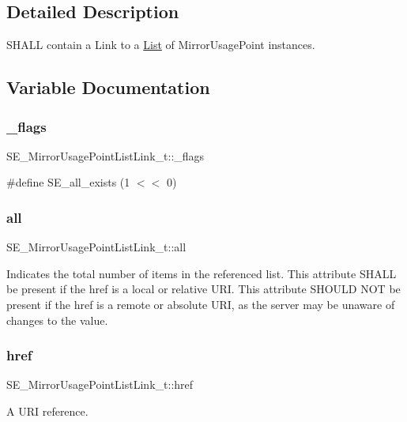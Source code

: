 \subsection{Detailed Description}
S\+H\+A\+LL contain a Link to a \hyperlink{structList}{List} of Mirror\+Usage\+Point instances. 

\subsection{Variable Documentation}
\mbox{\label{group__MirrorUsagePointListLink_ga7a496bf032accedbfb6d6c3b2fea9c22}} 
\subsubsection{\texorpdfstring{\+\_\+flags}{\_flags}}
{\footnotesize\ttfamily S\+E\+\_\+\+Mirror\+Usage\+Point\+List\+Link\+\_\+t\+::\+\_\+flags}

\#define S\+E\+\_\+all\+\_\+exists (1 $<$$<$ 0) \mbox{\label{group__MirrorUsagePointListLink_gad6bab1c2ec9114c3752213d0707541fc}} 
\subsubsection{\texorpdfstring{all}{all}}
{\footnotesize\ttfamily S\+E\+\_\+\+Mirror\+Usage\+Point\+List\+Link\+\_\+t\+::all}

Indicates the total number of items in the referenced list. This attribute S\+H\+A\+LL be present if the href is a local or relative U\+RI. This attribute S\+H\+O\+U\+LD N\+OT be present if the href is a remote or absolute U\+RI, as the server may be unaware of changes to the value. \mbox{\label{group__MirrorUsagePointListLink_ga5a3c1659ae4db4cd0676e59b417d6226}} 
\subsubsection{\texorpdfstring{href}{href}}
{\footnotesize\ttfamily S\+E\+\_\+\+Mirror\+Usage\+Point\+List\+Link\+\_\+t\+::href}

A U\+RI reference. 